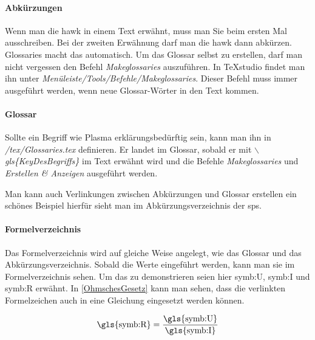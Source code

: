	\paragraph{Abkürzungen}
	
	Wenn man die \gls{hawk} in einem Text erwähnt, muss man Sie beim ersten Mal ausschreiben. Bei der zweiten Erwähnung darf man die \gls{hawk} dann abkürzen. Glossaries macht das automatisch. Um das Glossar selbst zu erstellen, darf man nicht vergessen den Befehl \textit{Makeglossaries} auszuführen. In TeXstudio findet man ihn unter \textit{Menüleiste/Tools/Befehle/Makeglossaries}. Dieser Befehl muss immer ausgeführt werden, wenn neue Glossar-Wörter in den Text kommen. 
	
	\paragraph{Glossar}
	
	Sollte ein Begriff wie \gls{Plasma} erklärungsbedürftig sein, kann man ihn in \textit{/tex/Glossaries.tex} definieren. Er landet im Glossar, sobald er mit \textit{$\backslash$gls\{KeyDesBegriffs\}} im Text erwähnt wird und die Befehle \textit{Makeglossaries} und \textit{Erstellen \& Anzeigen} ausgeführt werden.
	
	Man kann auch Verlinkungen zwischen Abkürzungen und Glossar erstellen ein schönes Beispiel hierfür sieht man im Abkürzungsverzeichnis der \gls{sps}.
	
	
	\paragraph{Formelverzeichnis}
	
	Das Formelverzeichnis wird auf gleiche Weise angelegt, wie das Glossar und das Abkürzungsverzeichnis. Sobald die Werte eingeführt werden, kann man sie im Formelverzeichnis sehen. Um das zu demonstrieren seien hier \gls{symb:U}, \gls{symb:I} und \gls{symb:R} erwähnt. In \autoref{OhmschesGesetz} kann man sehen, dass die verlinkten Formelzeichen auch in eine Gleichung eingesetzt werden können.
	
	\begin{align}
		\text{\gls{symb:R}}=\frac{\text{\gls{symb:U}}}{\text{\gls{symb:I}}} \label{OhmschesGesetz}
		\end{align}
	
	
	

